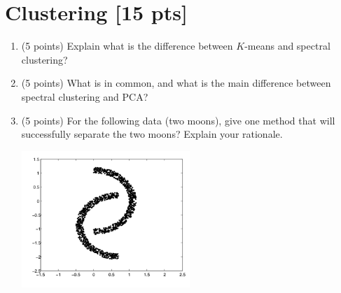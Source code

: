 \documentclass[a4paper,12pt,fleqn]{article}
\begin{document}
% 	
% 	

\clearpage
\section{Clustering [15 pts]}


\begin{enumerate}

\item (5 points) Explain what is the difference between $K$-means and spectral clustering? 

\vspace{1.5in}


\item (5 points) What is in common, and what is the main difference between spectral clustering and PCA?

\vspace{1.5in}

\item (5 points) For the following data (two moons), give one method that will successfully separate the two moons? Explain your rationale. 

\begin{center}
\includegraphics[width = 0.5\textwidth]{moon}
\end{center}

\end{enumerate}
\end{document}
